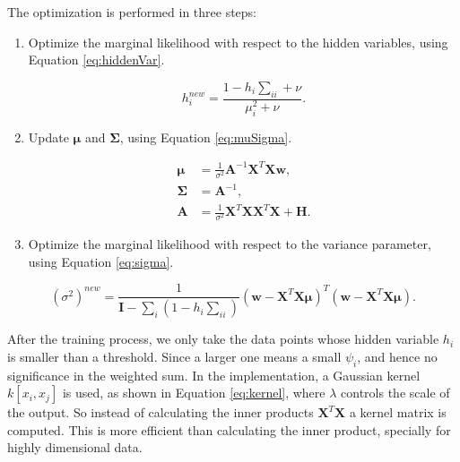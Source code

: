 \documentclass[12pt]{article}
\begin{document}
The optimization is performed in three steps:
\begin{enumerate}
\item Optimize the marginal likelihood with respect to the hidden variables, using Equation \ref{eq:hiddenVar}.

\begin{equation}
\label{eq:hiddenVar}
h_i^{new} = \frac{1 - h_i \sum_{ii} + \nu}{\mu^2_i + \nu}.
\end{equation}

\item Update $\boldsymbol{\mu}$ and $\mathbf{\Sigma}$, using Equation \ref{eq:muSigma}.

\begin{equation}
\label{eq:muSigma}
\begin{split}
\boldsymbol{\mu} &= \frac{1}{\sigma^2} \mathbf{A}^{-1} \mathbf{X}^T \mathbf{X} \mathbf{w},\\
\mathbf{\Sigma} &= \mathbf{A}^{-1},\\
\mathbf{A} &= \frac{1}{\sigma^2} \mathbf{X}^T \mathbf{X} \mathbf{X}^T \mathbf{X} + \mathbf{H}.
\end{split}
\end{equation}

\item Optimize the marginal likelihood with respect to the variance parameter, using Equation \ref{eq:sigma}.
\end{enumerate}
 
\begin{equation}
\label{eq:sigma}
(\sigma^2)^{new} = \frac{1}{\mathbf{I} - \sum_i ( 1 - h_i \sum_{ii})}  \left( \mathbf{w} - \mathbf{X}^T \mathbf{X} \boldsymbol{\mu} \right)^T \left( \mathbf{w} - \mathbf{X}^T \mathbf{X} \boldsymbol{\mu} \right).
\end{equation}

After the training process, we only take the data points whose hidden variable $h_i$ is smaller than a threshold. Since a larger one means a small $\psi_i$, and hence no significance in the weighted sum.
In the implementation, a Gaussian kernel $k[x_i,x_j]$ is used, as shown in Equation \ref{eq:kernel}, where $\lambda$ controls the scale of the output.
So instead of calculating the inner products $\mathbf{X}^T \mathbf{X}$ a kernel matrix is computed.
This is more efficient than calculating the inner product, specially for highly dimensional data.
\end{document}
